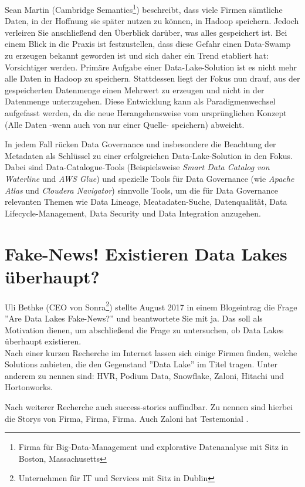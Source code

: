 \documentclass[twoside,twocolumn]{article}
\begin{document}
Sean Martin (Cambridge Semantics\footnote{Firma für Big-Data-Management und explorative Datenanalyse mit Sitz in Boston, Massachusetts}) beschreibt, dass viele Firmen sämtliche Daten, in der Hoffnung sie später nutzen zu können, in Hadoop speichern. Jedoch verleiren Sie anschließend den Überblick darüber, was alles gespeichert ist.
Bei einem Blick in die Praxis ist festzustellen, dass diese Gefahr einen Data-Swamp zu erzeugen bekannt geworden ist und sich daher ein Trend etabliert hat: Vorsichtiger werden. Primäre Aufgabe einer Data-Lake-Solution ist es nicht mehr alle Daten in Hadoop zu speichern. Stattdessen liegt der Fokus nun drauf, aus der gespeicherten Datenmenge einen Mehrwert zu erzeugen und nicht in der Datenmenge unterzugehen. \cite{src1} Diese Entwicklung kann als Paradigmenwechsel aufgefasst werden, da die neue Herangehensweise vom ursprünglichen Konzept (Alle Daten -wenn auch von nur einer Quelle- speichern) abweicht.

In jedem Fall rücken Data Governance und insbesondere die Beachtung der Metadaten als Schlüssel zu einer erfolgreichen Data-Lake-Solution in den Fokus. Dabei sind Data-Catalogue-Tools (Beispielsweise \textit{Smart Data Catalog von Waterline} und \textit{AWS Glue}) und spezielle Tools für Data Governance (wie \textit{Apache Atlas} und \textit{Cloudera Navigator}) sinnvolle Tools, um die für Data Governance relevanten Themen wie Data Lineage, Meatadaten-Suche, Datenqualität, Data Lifecycle-Management, Data Security und Data Integration anzugehen.\cite{src8}

\section{Fake-News! Existieren Data Lakes überhaupt?}
Uli Bethke (CEO von Sonra\footnote{Unternehmen für IT und Services mit Sitz in Dublin}) stellte August 2017 in einem Blogeintrag\cite{src4} die Frage ''Are Data Lakes Fake-News?'' und beantwortete Sie mit ja. Das soll als Motivation dienen, um abschließend die Frage zu untersuchen, ob Data Lakes überhaupt existieren.\\

Nach einer kurzen Recherche im Internet lassen sich einige Firmen finden, welche Solutions anbieten, die den Gegenstand ''Data Lake'' im Titel tragen. Unter anderem zu nennen sind: HVR, Podium Data, Snowflake, Zaloni\cite{c1}, Hitachi\cite{c2} und Hortonworks\cite{c3}.

Nach weiterer Recherche auch success-stories auffindbar. 
Zu nennen sind hierbei die Storys von Firma\cite{ss1}, Firma\cite{ss2}, Firma\cite{ss3}. Auch Zaloni hat Testemonial \cite{ss4}.
\end{document}
